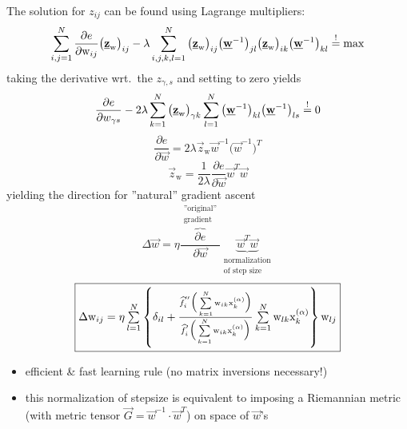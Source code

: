 The solution for $z_{ij}$ can be found using Lagrange multipliers:
\begin{equation}
	\sum\limits_{i,j = 1}^N \frac{\partial e}{\partial \mathrm{w}_{ij}}
	\big( \underline{\mathbf{z}}_{\mathrm{w}} \big)_{ij} - \lambda 
	\sum\limits_{i,j,k,l = 1}^N \big( \underline{\mathbf{z}}_{\mathrm{w}} \big)_{ij}
	\big( \underline{\mathbf{w}}^{-1} \big)_{jl} \big( \underline{\mathbf{z}}_{\mathrm{w}} \big)_{ik}
	\big( \underline{\mathbf{w}}^{-1} \big)_{kl} \stackrel{\mathrm{!}}{=} \max
\end{equation}
taking the derivative wrt.\ the $z_{\gamma,s}$ and setting to zero yields
\begin{equation}
	\frac{\partial e}{\partial w_{\gamma s}} - 2 \lambda
	\sum\limits_{k = 1}^N \big( \underline{\mathbf{z}}_{\mathrm{w}} \big)_{\gamma k}
	\sum\limits_{l = 1}^N \big( \underline{\mathbf{w}}^{-1} \big)_{kl} 
	\big( \underline{\mathbf{w}}^{-1} \big)_{ls} \stackrel{\mathrm{!}}{=} 0
\end{equation}
\begin{equation}
	\frac{\partial e}{\partial \vec{w}} = 2 \lambda \vec{z}_{\mathrm{w}}
	\vec{w}^{-1} \big( \vec{w}^{-1} \big)^T
\end{equation}
\begin{equation}
	\vec{z}_{\mathrm{w}} = \frac{1}{2\lambda} \frac{\partial e}{\partial
		\vec{w}} \vec{w}^T \vec{w}
\end{equation}
yielding the direction for ''natural'' gradient ascent
\begin{equation}
	\Delta \vec{w} = \eta \frac{ \overbrace{\partial e}^{
		\substack{	\text{''original''} \\ 
				\text{gradient}} }}{\partial \vec{w}}
		\underbrace{ \vec{w}^T \vec{w} }_{
			\substack{	\text{normalization} \\
					\text{of step size}} }
\end{equation}
\begin{equation} \label{eq:natgrad2}
	\fbox{$ \Delta \mathrm{w}_{ij} = \eta \sum\limits_{l = 1}^N
	\left\{ \delta_{il} 
	+ \frac{ \widehat{f}_i^{''} \Big( \sum\limits_{k = 1}^N 
			\mathrm{w}_{ik} \mathrm{x}_k^{(\alpha)} \Big)
			}{\widehat{f}_i^{'} \Big( \sum\limits_{k = 1}^N 
			\mathrm{w}_{ik} \mathrm{x}_k^{(\alpha)} \Big)}
	\sum\limits_{k = 1}^N \mathrm{w}_{lk} \mathrm{x}_k^{(\alpha)}
	\right\} \mathrm{w}_{lj}
	$}
\end{equation}
\begin{itemize}
\item efficient \& fast learning rule (no matrix inversions
  necessary!)
\item this normalization of stepsize is equivalent to imposing a
  Riemannian metric (with metric tensor $\vec{G} = \vec{w}^{-1} \cdot
  \vec{w}^T$) on space of $\vec{w}$'s
\end{itemize}


